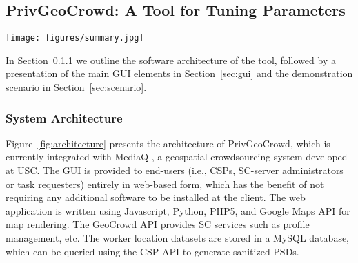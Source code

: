 \documentclass{USC-Thesis}
\newcommand{\PGC}{{PrivGeoCrowd}}
\numberwithin{equation}{chapter}
\begin{document}
\subsection{P\lowercase{riv}G\lowercase{eo}C\lowercase{rowd}: A Tool for Tuning Parameters}
\label{sec:software}

\begin{figure*}[!htb]\centering
  \texttt{[image: figures/summary.jpg]}
  \caption{\PGC\ main GUI integrates several component module panels}
  \label{fig:main}
\end{figure*}

In Section~\ref{sec:architecture} we outline the software architecture of the tool, followed by a presentation of the main GUI elements in Section~\ref{sec:gui} and the demonstration scenario in Section~\ref{sec:scenario}.

\subsubsection{System Architecture}
\label{sec:architecture}

Figure~\ref{fig:architecture} presents the architecture of \PGC, which is currently integrated with MediaQ \cite{kim2014mediaq}, a geospatial crowdsourcing system developed at USC. The GUI is provided to end-users (i.e., CSPs, SC-server administrators or task requesters) entirely in web-based form, which has the benefit of not requiring any additional software to be installed at the client. The web application is written using Javascript, Python, PHP5, and Google Maps API for map rendering. The GeoCrowd API provides SC services \cite{kim2014mediaq} such as profile management, etc. The worker location datasets are stored in a MySQL database, which can be queried using the CSP API to generate sanitized PSDs.


\end{document}
